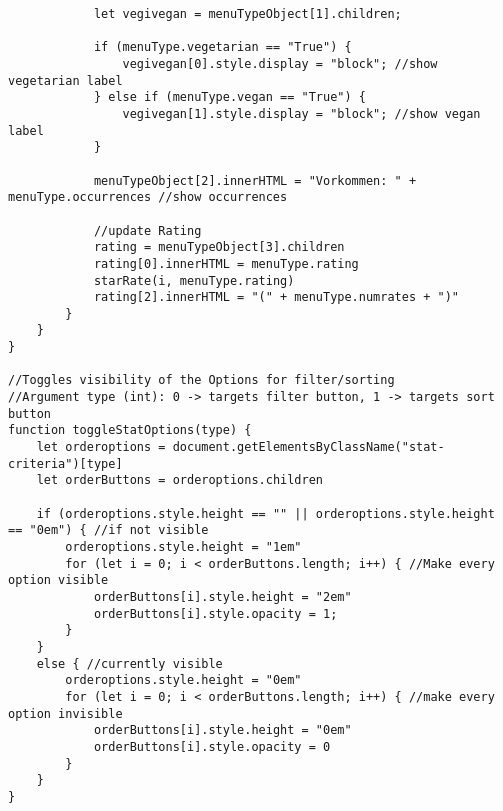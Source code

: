 \begin{lstlisting}
            let vegivegan = menuTypeObject[1].children;

            if (menuType.vegetarian == "True") {
                vegivegan[0].style.display = "block"; //show vegetarian label
            } else if (menuType.vegan == "True") {
                vegivegan[1].style.display = "block"; //show vegan label
            }

            menuTypeObject[2].innerHTML = "Vorkommen: " + menuType.occurrences //show occurrences

            //update Rating
            rating = menuTypeObject[3].children
            rating[0].innerHTML = menuType.rating
            starRate(i, menuType.rating)
            rating[2].innerHTML = "(" + menuType.numrates + ")"
        }
    }
}

//Toggles visibility of the Options for filter/sorting
//Argument type (int): 0 -> targets filter button, 1 -> targets sort button
function toggleStatOptions(type) {
    let orderoptions = document.getElementsByClassName("stat-criteria")[type]
    let orderButtons = orderoptions.children

    if (orderoptions.style.height == "" || orderoptions.style.height == "0em") { //if not visible
        orderoptions.style.height = "1em"
        for (let i = 0; i < orderButtons.length; i++) { //Make every option visible
            orderButtons[i].style.height = "2em"
            orderButtons[i].style.opacity = 1;
        }
    }
    else { //currently visible
        orderoptions.style.height = "0em"
        for (let i = 0; i < orderButtons.length; i++) { //make every option invisible
            orderButtons[i].style.height = "0em"
            orderButtons[i].style.opacity = 0
        }
    }
}
\end{lstlisting}